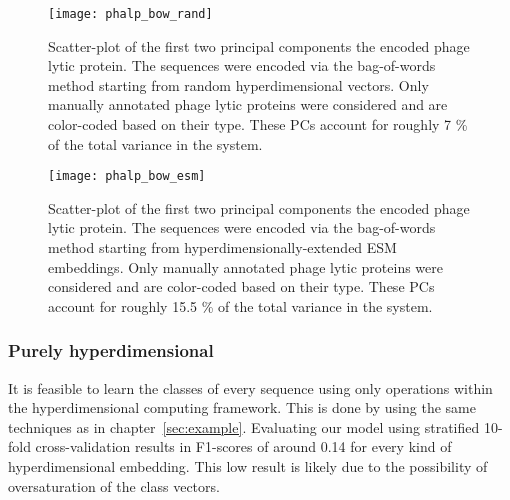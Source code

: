 \begin{figure}[H]
    \centering
    \texttt{[image: phalp\_bow\_rand]}
    \caption{Scatter-plot of the first two principal components the encoded phage lytic protein. The sequences were encoded via the bag-of-words method starting from random hyperdimensional vectors. Only manually annotated phage lytic proteins were considered and are color-coded based on their type. These PCs account for roughly 7 \% of the total variance in the system.}
    \label{fig:phalpbowrand}
\end{figure}

\begin{figure}[H]
    \centering
    \texttt{[image: phalp\_bow\_esm]}
    \caption{Scatter-plot of the first two principal components the encoded phage lytic protein. The sequences were encoded via the bag-of-words method starting from hyperdimensionally-extended ESM embeddings. Only manually annotated phage lytic proteins were considered and are color-coded based on their type. These PCs account for roughly 15.5 \% of the total variance in the system.}
    \label{fig:phalpbowesm}
\end{figure}

\subsubsection*{Purely hyperdimensional}

\begin{table}[h]
    \caption{\label{tab:phalpclass}Results of type classifications using the principal classification technique of hyperdimensional computing and an XGBoost classifier with several kinds of embeddings}
\end{table}

It is feasible to learn the classes of every sequence using only operations within the hyperdimensional computing framework. This is done by using the same techniques as in chapter~\ref{sec:example}. Evaluating our model using stratified 10-fold cross-validation results in F1-scores of around 0.14 for every kind of hyperdimensional embedding. This low result is likely due to the possibility of oversaturation of the class vectors.

